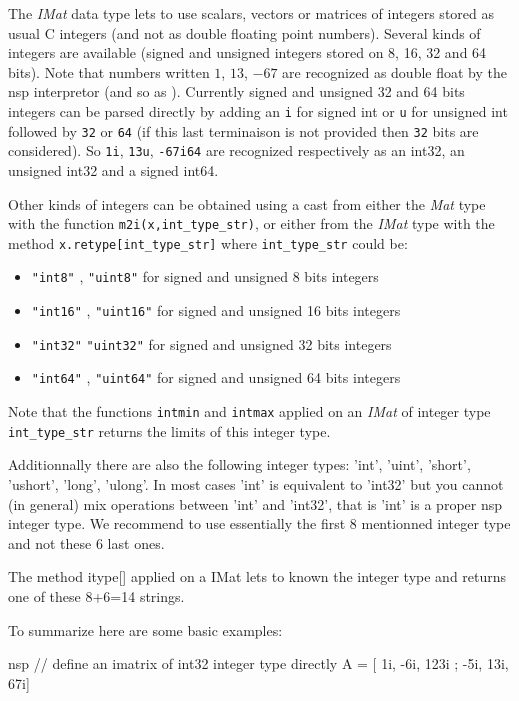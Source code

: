 \begin{mandescription}

The \emph{IMat} data type lets to use scalars, vectors or matrices of
integers stored as usual C integers (and not as double floating point numbers). 
Several kinds of integers are available (signed and unsigned integers stored
on 8, 16, 32 and 64 bits). Note that numbers written $1$, $13$, $-67$
are recognized as double float by the nsp interpretor (and so as ).
Currently signed and unsigned 32 and 64 bits integers can be parsed
directly by adding an \verb+i+ for signed int or  \verb+u+ for unsigned int 
followed by \verb+32+ or \verb+64+ (if this last terminaison is not provided
then \verb+32+ bits are considered). So  \verb+1i+,  \verb+13u+, \verb+-67i64+
are recognized respectively as an int32, an unsigned int32 and a signed int64. 

Other kinds of integers can be obtained using a cast from either the \emph{Mat} type
with the function \verb=m2i(x,int_type_str)=, or either from the \emph{IMat} type with
the method \verb+x.retype[int_type_str]+ where \verb+int_type_str+ could be:
\begin{itemize}
\item \verb+"int8"+ , \verb+"uint8"+ for signed and unsigned 8 bits integers
\item \verb+"int16"+ , \verb+"uint16"+ for signed and unsigned 16 bits integers
\item \verb+"int32"+  \verb+"uint32"+ for signed and unsigned 32 bits integers
\item \verb+"int64"+ , \verb+"uint64"+ for signed and unsigned 64 bits integers
\end{itemize}
Note that the functions \verb+intmin+ and  \verb+intmax+  applied on an \emph{IMat} of
integer type \verb+int_type_str+ returns the limits of this integer type.

Additionnally there are also the following integer types: 'int', 'uint', 
'short', 'ushort', 'long', 'ulong'. In most cases 'int' is equivalent
to 'int32' but you cannot (in general) mix operations between  'int' and
'int32', that is 'int' is a proper nsp integer type. We recommend to use
essentially the first 8 mentionned integer type and not these 6 last ones.  

The method itype[] applied on a IMat lets to known the integer type and returns 
one of these 8+6=14 strings.

To summarize here are some basic examples:
\begin{mintednsp}{nsp}
// define an imatrix of int32 integer type directly
A = [ 1i, -6i, 123i ;
     -5i, 13i,  67i]


\end{mintednsp}
\end{mandescription}
